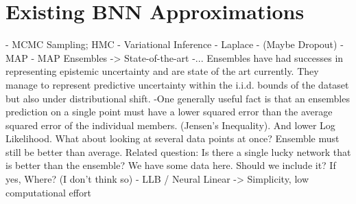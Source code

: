 \documentclass[../thesis.tex]{subfiles}
\begin{document}
\section{Existing BNN Approximations}
- MCMC Sampling; HMC 
- Variational Inference 
- Laplace
- (Maybe Dropout)
- MAP
- MAP Ensembles -> State-of-the-art
    -... Ensembles have had successes in representing epistemic uncertainty and are state of the art currently. They manage to represent predictive uncertainty within the i.i.d. bounds of the dataset but also under distributional shift.
    -One generally useful fact is that an ensembles prediction on a single point must have a lower squared error than the average squared error of the individual members. (Jensen's Inequality). And lower Log Likelihood.
    What about looking at several data points at once? Ensemble must still be better than average.
    Related question: Is there a single lucky network that is better than the ensemble? 
    We have some data here. Should we include it? If yes, Where? (I don't think so)
- LLB / Neural Linear -> Simplicity, low computational effort
\end{document}
